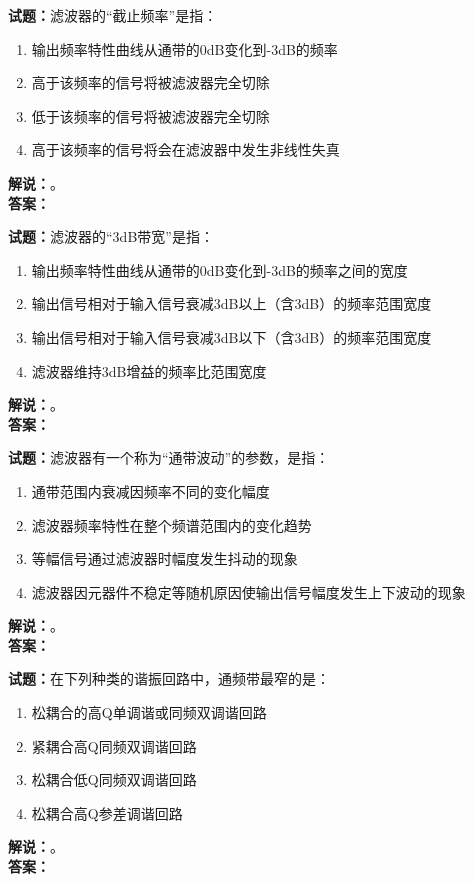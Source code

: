 \documentclass{ctexbook}
\begin{document}
\vspace{\baselineskip}

\noindent\textbf{试题：}滤波器的“截止频率”是指：
\begin{enumerate}[leftmargin=3em]
  \item 输出频率特性曲线从通带的0dB变化到-3dB的频率
  \item 高于该频率的信号将被滤波器完全切除
  \item 低于该频率的信号将被滤波器完全切除
  \item 高于该频率的信号将会在滤波器中发生非线性失真
\end{enumerate}
\noindent\textbf{解说：}\textbf{}。\\\noindent\textbf{答案：}

\vspace{\baselineskip}

\noindent\textbf{试题：}滤波器的“3dB带宽”是指：
\begin{enumerate}[leftmargin=3em]
  \item 输出频率特性曲线从通带的0dB变化到-3dB的频率之间的宽度
  \item 输出信号相对于输入信号衰减3dB以上（含3dB）的频率范围宽度
  \item 输出信号相对于输入信号衰减3dB以下（含3dB）的频率范围宽度
  \item 滤波器维持3dB增益的频率比范围宽度
\end{enumerate}
\noindent\textbf{解说：}\textbf{}。\\\noindent\textbf{答案：}

\vspace{\baselineskip}

\noindent\textbf{试题：}滤波器有一个称为“通带波动”的参数，是指：
\begin{enumerate}[leftmargin=3em]
  \item 通带范围内衰减因频率不同的变化幅度
  \item 滤波器频率特性在整个频谱范围内的变化趋势
  \item 等幅信号通过滤波器时幅度发生抖动的现象
  \item 滤波器因元器件不稳定等随机原因使输出信号幅度发生上下波动的现象
\end{enumerate}
\noindent\textbf{解说：}\textbf{}。\\\noindent\textbf{答案：}

\vspace{\baselineskip}

\noindent\textbf{试题：}在下列种类的谐振回路中，通频带最窄的是：
\begin{enumerate}[leftmargin=3em]
  \item 松耦合的高Q单调谐或同频双调谐回路
  \item 紧耦合高Q同频双调谐回路
  \item 松耦合低Q同频双调谐回路
  \item 松耦合高Q参差调谐回路
\end{enumerate}
\noindent\textbf{解说：}\textbf{}。\\\noindent\textbf{答案：}
\end{document}
